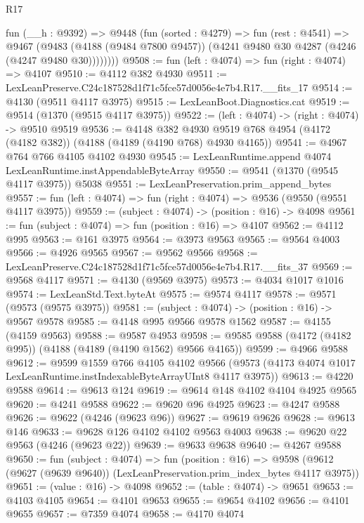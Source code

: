 \begin{lexlean}{R17}
\begin{coremodule}
        fun (__h : @9392) =>
        @9448
          (fun (sorted : @4279) =>
          fun (rest : @4541) =>
          @9467
            (@9483
              (@4188 (@9484 @7800 @9457))
              (@4241 @9480 @30 @4287 (@4246 (@4247 @9480 @30))))))))
@9508 := fun (left : @4074) => fun (right : @4074) => @4107
@9510 := @4112 @382 @4930
@9511 := LexLeanPreserve.C24c187528d1f71c5fce57d0056e4e7b4.R17.__fits_17
@9514 := @4130 (@9511 @4117 @3975)
@9515 := LexLeanBoot.Diagnostics.cat
@9519 := @9514 (@1370 (@9515 @4117 @3975))
@9522 := (left : @4074) -> (right : @4074) -> @9510 @9519
@9536 := @4148
    @382
    @4930
    @9519
    @768
    @4954
    (@4172 (@4182 @382))
    (@4188 (@4189 (@4190 @768) @4930 @4165))
@9541 := @4967 @764 @766 @4105 @4102 @4930
@9545 := LexLeanRuntime.append @4074 LexLeanRuntime.instAppendableByteArray
@9550 := @9541 (@1370 (@9545 @4117 @3975)) @5038
@9551 := LexLeanPreservation.prim_append_bytes
@9557 := fun (left : @4074) => fun (right : @4074) => @9536 (@9550 (@9551 @4117 @3975))
@9559 := (subject : @4074) -> (position : @16) -> @4098
@9561 := fun (subject : @4074) => fun (position : @16) => @4107
@9562 := @4112 @995
@9563 := @161 @3975
@9564 := @3973 @9563
@9565 := @9564 @4003
@9566 := @4926 @9565
@9567 := @9562 @9566
@9568 := LexLeanPreserve.C24c187528d1f71c5fce57d0056e4e7b4.R17.__fits_37
@9569 := @9568 @4117
@9571 := @4130 (@9569 @3975)
@9573 := @4034 @1017 @1016
@9574 := LexLeanStd.Text.byteAt
@9575 := @9574 @4117
@9578 := @9571 (@9573 (@9575 @3975))
@9581 := (subject : @4074) -> (position : @16) -> @9567 @9578
@9585 := @4148 @995 @9566 @9578 @1562
@9587 := @4155 (@4159 @9563)
@9588 := @9587 @4953
@9598 := @9585 @9588 (@4172 (@4182 @995)) (@4188 (@4189 (@4190 @1562) @9566 @4165))
@9599 := @4966 @9588
@9612 := @9599
    @1559
    @766
    @4105
    @4102
    @9566
    (@9573 (@4173 @4074 @1017 LexLeanRuntime.instIndexableByteArrayUInt8 @4117 @3975))
@9613 := @4220 @9588
@9614 := @9613 @124
@9619 := @9614 @148 @4102 @4104 @4925 @9565
@9620 := @4241 @9588
@9622 := @9620 @96 @4925
@9623 := @4247 @9588
@9626 := @9622 (@4246 (@9623 @96))
@9627 := @9619 @9626
@9628 := @9613 @146
@9633 := @9628 @126 @4102 @4102 @9563 @4003
@9638 := @9620 @22 @9563 (@4246 (@9623 @22))
@9639 := @9633 @9638
@9640 := @4267 @9588
@9650 := fun (subject : @4074) =>
  fun (position : @16) =>
  @9598 (@9612 (@9627 (@9639 @9640)) (LexLeanPreservation.prim_index_bytes @4117 @3975))
@9651 := (value : @16) -> @4098
@9652 := (table : @4074) -> @9651
@9653 := @4103 @4105
@9654 := @4101 @9653
@9655 := @9654 @4102
@9656 := @4101 @9655
@9657 := @7359 @4074
@9658 := @4170 @4074

\end{coremodule}
\end{lexlean}
